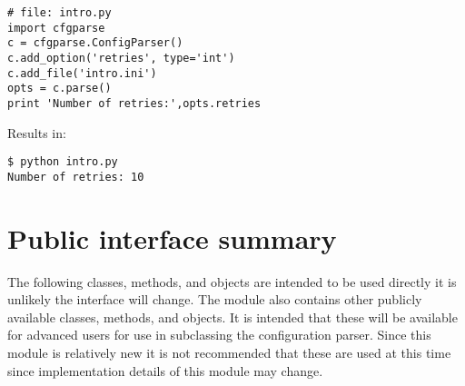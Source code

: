 \documentclass{howto}
\begin{document}
\begin{verbatim}
# file: intro.py
import cfgparse
c = cfgparse.ConfigParser()
c.add_option('retries', type='int')
c.add_file('intro.ini')
opts = c.parse()
print 'Number of retries:',opts.retries
\end{verbatim}

Results in:

\begin{verbatim}
$ python intro.py
Number of retries: 10
\end{verbatim}


\pagebreak


\section{Public interface summary}

The following classes, methods, and objects are intended to be used directly
it is unlikely the interface will change.
The module also contains other publicly available classes, methods, and 
objects.  It is intended that these will be available for advanced users 
for use in subclassing the configuration parser.  Since this module is 
relatively new it is not recommended that these are used at this time since
implementation details of this module may change.
\end{document}
